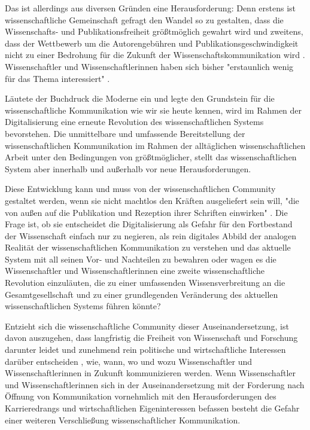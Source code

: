 Das ist allerdings aus diversen Gründen eine Herausforderung: Denn erstens ist wissenschaftliche Gemeinschaft gefragt den Wandel so zu gestalten, dass die Wissenschafts- und Publikationsfreiheit größtmöglich gewahrt wird und zweitens, dass der Wettbewerb um die Autorengebühren und Publikationsgeschwindigkeit nicht zu einer Bedrohung für die Zukunft der Wissenschaftskommunikation wird \cite{Beall_2012} \cite{Lossau_oa_2007}. Wissenschaftler und Wissenschaftlerinnen haben sich bisher "erstaunlich wenig für das Thema interessiert" \cite{hagner_2015_sache_buches}.

Läutete der Buchdruck die Moderne ein und legte den Grundstein für die wissenschaftliche Kommunikation wie wir sie heute kennen, wird im Rahmen der Digitalisierung eine erneute Revolution des wissenschaftlichen Systems bevorstehen. Die unmittelbare und umfassende Bereitstellung der wissenschaftlichen Kommunikation im Rahmen der alltäglichen wissenschaftlichen Arbeit unter den Bedingungen von größtmöglicher, stellt das wissenschaftlichen System aber innerhalb und außerhalb vor neue Herausforderungen.

Diese Entwicklung kann und muss von der wissenschaftlichen Community gestaltet werden, wenn sie nicht machtlos den Kräften ausgeliefert sein will, "die von außen auf die Publikation und Rezeption ihrer Schriften einwirken" \cite{Hirschi_2015_buch_oa}. Die Frage ist, ob sie entscheidet die Digitalisierung als Gefahr für den Fortbestand der Wissenschaft einfach nur zu negieren, als rein digitales Abbild der analogen Realität der wissenschaftlichen Kommunikation zu verstehen und das aktuelle System mit all seinen Vor- und Nachteilen zu bewahren oder wagen es die Wissenschaftler und Wissenschaftlerinnen eine zweite wissenschaftliche Revolution einzuläuten, die zu einer umfassenden Wissensverbreitung an die Gesamtgesellschaft und zu einer grundlegenden Veränderung des aktuellen wissenschaftlichen Systems führen könnte?

Entzieht sich die wissenschaftliche Community dieser Auseinandersetzung, ist davon auszugehen, dass langfristig die Freiheit von Wissenschaft und Forschung darunter leidet und zunehmend rein politische und wirtschaftliche Interessen darüber entscheiden \cite{Warnke_2012}, wie, wann, wo und wozu Wissenschaftler und Wissenschaftlerinnen in Zukunft kommunizieren werden. Wenn Wissenschaftler und Wissenschaftlerinnen sich in der Auseinandersetzung mit der Forderung nach Öffnung von Kommunikation vornehmlich mit den Herausforderungen des Karrieredrangs und wirtschaftlichen Eigeninteressen befassen \cite{resnik_2005_ethics} besteht die Gefahr einer weiteren Verschließung wissenschaftlicher Kommunikation.

